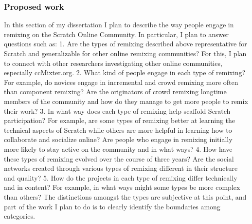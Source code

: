 \subsubsection{Proposed work}
In this section of my dissertation I plan to describe the way people engage in remixing on the Scratch Online Community. 
In particular, I plan to answer questions such as:
1. Are the types of remixing described above representative for Scratch and generalizable for other online remixing communities? 
For this, I plan to connect with other researchers investigating other online communities, especially ccMixter.org.
2. What kind of people engage in each type of remixing? For example, do novices engage in incremental and crowd remixing more often than component remixing? Are the originators of crowd remixing longtime members of the community and how do they manage to get more people to remix their work?
3. In what way does each type of remixing help scaffold Scratch participation? For example, are some types of remixing better at learning the technical aspects of Scratch while others are more helpful in learning how to collaborate and socialize online? Are people who engage in remixing initially more likely to stay active on the community and in what ways?
4. How have these types of remixing evolved over the course of three years?
Are the social networks created through various types of remixing different in their structure and quality?
5. How do the projects in each type of remixing differ technically and in content? For example, in what ways might some types be more complex than others?
The distinctions amongst the types are subjective at this point, and part of the work I plan to do is to clearly identify the boundaries among categories.

